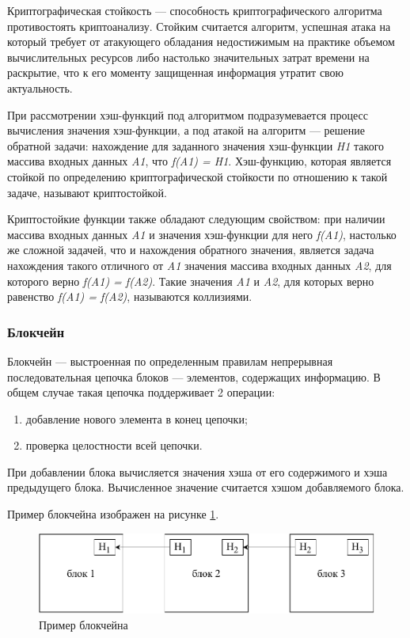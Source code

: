 Криптографическая стойкость --- способность криптографического алгоритма противостоять криптоанализу. Стойким считается алгоритм, успешная атака на который требует от атакующего обладания недостижимым на практике объемом вычислительных ресурсов либо настолько значительных затрат времени на раскрытие, что к его моменту защищенная информация утратит свою актуальность. \cite{crypto}

При рассмотрении хэш-функций под алгоритмом подразумевается процесс вычисления значения хэш-функции, а под атакой на алгоритм --- решение обратной задачи: нахождение для заданного значения хэш-функции \textit{H1} такого массива входных данных \textit{A1}, что \textit{f(A1) = H1}. Хэш-функцию, которая является стойкой по определению криптографической стойкости по отношению к такой задаче, называют криптостойкой.

Криптостойкие функции также обладают следующим свойством: при наличии массива входных данных \textit{A1} и значения хэш-функции для него \textit{f(A1)}, настолько же сложной задачей, что и нахождения обратного значения, является задача нахождения такого отличного от \textit{A1} значения массива входных данных \textit{A2}, для которого верно \textit{f(A1) = f(A2)}. Такие значения \textit{A1} и \textit{A2}, для которых верно равенство \textit{f(A1) = f(A2)}, называются коллизиями.

\subsubsection{Блокчейн}

Блокчейн --- выстроенная по определенным правилам непрерывная последовательная цепочка блоков --- элементов, содержащих информацию. \cite{bitcoin} В общем случае такая цепочка поддерживает 2 операции:
\begin{enumerate}
    \item добавление нового элемента в конец цепочки;
    \item проверка целостности всей цепочки.
\end{enumerate}

При добавлении блока вычисляется значения хэша от его содержимого и хэша предыдущего блока. Вычисленное значение считается хэшом добавляемого блока.

Пример блокчейна изображен на рисунке \ref{fig:blockchain}.

\begin{figure}[hbtp]
    \centering
    \includegraphics[width=\textwidth]{img/blockchain.pdf}
    \caption{Пример блокчейна}
    \label{fig:blockchain}
\end{figure}

